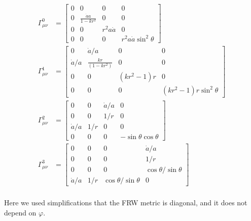 \begin{subequations}
    \begin{align}
            \Gamma^{0}_{\mu \nu } &= \left[\begin{array}{cccc}
            0 & 0 & 0 & 0 \\ 
            0 & \frac{\dot{a}a}{1-kr^2} & 0 & 0 \\ 
            0 & 0 & r^2a \dot{a} & 0 \\ 
            0 & 0 & 0 & r^2 a \dot{a} \sin^2\theta 
            \end{array}\right]\label{eq:1.12a} \\
            \Gamma^{1}_{\mu \nu } &= \left[\begin{array}{cccc}
            0 & \dot{a} / a & 0 & 0 \\ 
            \dot{a} / a & \frac{kr}{(1-kr^2)} & 0 & 0 \\ 
            0 & 0 & (kr^2-1)r & 0 \\ 
            0 & 0 & 0 & (kr^2-1)r \sin^2\theta 
            \end{array}\right] \label{eq:1.12b}\\ 
            \Gamma^{2}_{\mu \nu } &= \left[\begin{array}{cccc}
            0 & 0 & \dot{a} / a & 0 \\ 
            0 & 0 & 1 / r & 0 \\ 
            \dot{a} / a & 1/r & 0 & 0 \\ 
            0 & 0 & 0 & - \sin \theta \cos \theta 
            \end{array}\right]\label{eq:1.12c} \\ 
            \Gamma^{3}_{\mu \nu } &= \left[\begin{array}{cccc}
            0 & 0 & 0 & \dot{a} / a \\ 
            0 & 0 & 0 & 1/r \\ 
            0 & 0 & 0 & \cos \theta  /\sin \theta  \\ 
            \dot{a} /a  & 1/r & \cos \theta  /\sin \theta  & 0
            \end{array}\right] \label{eq:1.12d}\\ 
    \end{align}
\end{subequations}
   

Here we used simplifications that the FRW metric is diagonal, and it does not depend on \(\varphi \).\\

